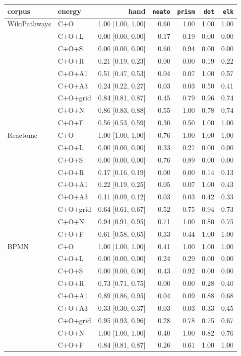 \documentclass[a4paper,UKenglish]{gd-lipics-v3}
\begin{document}
\begin{center}\scriptsize\setlength{\tabcolsep}{3.5pt}
\begin{tabular}{llrrrrr}
\toprule
corpus & energy & hand & \texttt{neato} & \texttt{prism} & \texttt{dot} & \texttt{elk} \\
\midrule
WikiPathways & C$+$O & 1.00 [1.00, 1.00] & 0.60 & 1.00 & 1.00 & 1.00 \\
& C$+$O$+$L & 0.00 [0.00, 0.00] & 0.17 & 0.19 & 0.00 & 0.00 \\
& C$+$O$+$S & 0.00 [0.00, 0.00] & 0.60 & 0.94 & 0.00 & 0.00 \\
& C$+$O$+$R & 0.21 [0.19, 0.23] & 0.00 & 0.00 & 0.19 & 0.22 \\
& C$+$O$+$A1 & 0.51 [0.47, 0.53] & 0.04 & 0.07 & 1.00 & 0.57 \\
& C$+$O$+$A3 & 0.24 [0.22, 0.27] & 0.03 & 0.03 & 0.50 & 0.41 \\
& C$+$O$+$grid & 0.84 [0.81, 0.87] & 0.45 & 0.79 & 0.96 & 0.74 \\
& C$+$O$+$N & 0.86 [0.83, 0.88] & 0.55 & 1.00 & 0.78 & 0.74 \\
& C$+$O$+$F & 0.56 [0.53, 0.59] & 0.30 & 0.50 & 1.00 & 1.00 \\
\midrule
Reactome & C$+$O & 1.00 [1.00, 1.00] & 0.76 & 1.00 & 1.00 & 1.00 \\
& C$+$O$+$L & 0.00 [0.00, 0.00] & 0.33 & 0.27 & 0.00 & 0.00 \\
& C$+$O$+$S & 0.00 [0.00, 0.00] & 0.76 & 0.89 & 0.00 & 0.00 \\
& C$+$O$+$R & 0.17 [0.16, 0.19] & 0.00 & 0.00 & 0.14 & 0.13 \\
& C$+$O$+$A1 & 0.22 [0.19, 0.25] & 0.05 & 0.07 & 1.00 & 0.43 \\
& C$+$O$+$A3 & 0.11 [0.09, 0.12] & 0.03 & 0.03 & 0.42 & 0.33 \\
& C$+$O$+$grid & 0.64 [0.61, 0.67] & 0.52 & 0.75 & 0.94 & 0.73 \\
& C$+$O$+$N & 0.94 [0.91, 0.95] & 0.71 & 1.00 & 0.80 & 0.75 \\
& C$+$O$+$F & 0.61 [0.58, 0.65] & 0.33 & 0.44 & 1.00 & 1.00 \\
\midrule
BPMN & C$+$O & 1.00 [1.00, 1.00] & 0.41 & 1.00 & 1.00 & 1.00 \\
& C$+$O$+$L & 0.00 [0.00, 0.00] & 0.24 & 0.29 & 0.00 & 0.00 \\
& C$+$O$+$S & 0.00 [0.00, 0.00] & 0.43 & 0.92 & 0.00 & 0.00 \\
& C$+$O$+$R & 0.73 [0.71, 0.75] & 0.00 & 0.00 & 0.28 & 0.40 \\
& C$+$O$+$A1 & 0.89 [0.86, 0.95] & 0.04 & 0.09 & 0.88 & 0.68 \\
& C$+$O$+$A3 & 0.33 [0.30, 0.37] & 0.03 & 0.03 & 0.33 & 0.45 \\
& C$+$O$+$grid & 0.95 [0.93, 0.96] & 0.28 & 0.78 & 0.75 & 0.67 \\
& C$+$O$+$N & 1.00 [1.00, 1.00] & 0.40 & 1.00 & 0.82 & 0.76 \\
& C$+$O$+$F & 0.84 [0.81, 0.87] & 0.26 & 0.61 & 1.00 & 1.00 \\
\bottomrule
\end{tabular}
\end{center}
\end{document}
